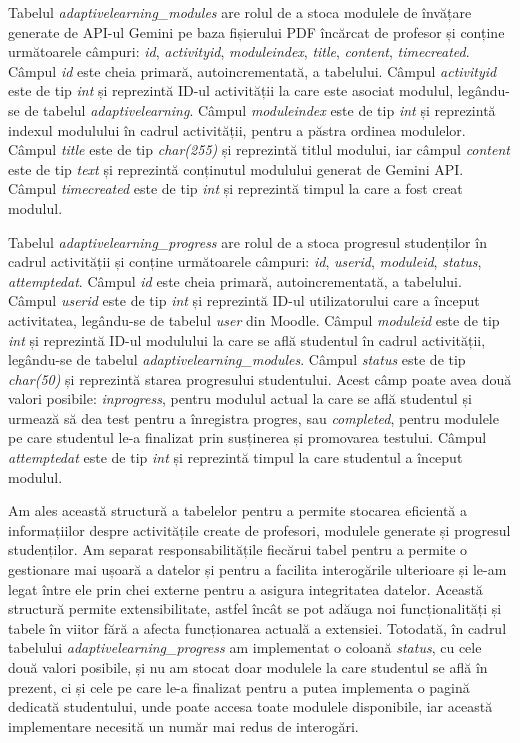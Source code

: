 Tabelul \textit{adaptivelearning\_modules} are rolul de a stoca modulele de învățare generate de API-ul Gemini pe baza fișierului PDF încărcat de profesor și conține următoare\-le câmpuri:
\textit{id}, \textit{activityid}, \textit{moduleindex}, \textit{title}, \textit{content}, \textit{timecreated}. Câmpul \textit{id} este cheia primară, autoincrementată, a tabelului. Câmpul 
\textit{activityid} este de tip \textit{int} și reprezintă ID-ul activității la care este asociat modulul, legându-se de tabelul \textit{adaptivelearning}. Câmpul \textit{moduleindex}
este de tip \textit{int} și reprezintă indexul modulului în cadrul activității, pentru a păstra ordinea modulelor. Câmpul \textit{title} este de tip \textit{char(255)} și reprezintă titlul
modului, iar câmpul \textit{content} este de tip \textit{text} și reprezintă conținutul modulului generat de Gemini API. Câmpul \textit{timecreated} este de tip \textit{int} și reprezintă 
timpul la care a fost creat modulul.

Tabelul \textit{adaptivelearning\_progress} are rolul de a stoca progresul studenților în cadrul activității și conține următoarele câmpuri: \textit{id}, \textit{userid}, \textit{moduleid}, 
\textit{status}, \textit{attemptedat}. Câmpul \textit{id} este cheia primară, autoincrementată, a tabelului. Câmpul \textit{userid} este de tip \textit{int} și reprezintă ID-ul 
utilizatorului care a început activitatea, legându-se de tabelul \textit{user} din Moodle. Câmpul \textit{moduleid} este de tip \textit{int} și reprezintă ID-ul modulului la care se află 
studentul în cadrul activității, legându-se de tabelul \textit{adaptivelearning\_modules}. Câmpul \textit{status} este de tip \textit{char(50)} și reprezintă starea progresului studentului. 
Acest câmp poate avea două valori posibile: \textit{inprogress}, pentru modulul actual la care se află studentul și urmează să dea test pentru a înregistra progres, sau \textit{completed}, 
pentru modulele pe care studentul le-a finalizat prin susținerea și promovarea testului. Câmpul \textit{attemptedat} este de tip \textit{int} și reprezintă timpul la care studentul a început 
modulul.

Am ales această structură a tabelelor pentru a permite stocarea eficientă a informa\-ți\-i\-lor despre activitățile create de profesori, modulele generate și progresul studenților. Am separat 
responsabilitățile fiecărui tabel pentru a permite o gestionare mai ușoară a datelor și pentru a facilita interogările ulterioare și le-am legat între ele prin chei externe pentru a
asigura integritatea datelor. Această structură permite extensibilitate, astfel încât se pot adăuga noi funcționalități și tabele în viitor fără a afecta funcționarea actuală a extensiei.
Totodată, în cadrul tabelului \textit{adaptivelearning\_progress} am implementat o coloană \textit{status}, cu cele două valori posibile, și nu am stocat doar modulele la care studentul se
află în prezent, ci și cele pe care le-a finalizat pentru a putea implementa o pagină dedicată studentului, unde poate accesa toate modulele disponibile, iar această implementare necesită 
un număr mai redus de interogări.
